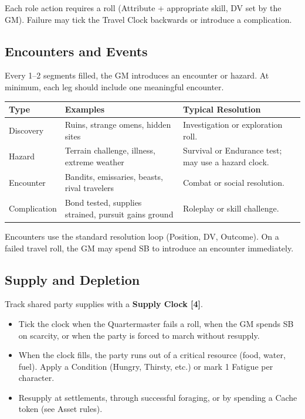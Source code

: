 Each role action requires a roll (Attribute + appropriate skill, DV set by the GM). Failure may tick the Travel Clock backwards or introduce a complication.

\subsection{Encounters and Events}

Every 1–2 segments filled, the GM introduces an encounter or hazard. At minimum, each leg should include one meaningful encounter.

\begin{tabular}{@{}lp{4cm}p{6cm}@{}}
\toprule
\textbf{Type} & \textbf{Examples} & \textbf{Typical Resolution} \\
\midrule
Discovery & Ruins, strange omens, hidden sites & Investigation or exploration roll. \\
Hazard & Terrain challenge, illness, extreme weather & Survival or Endurance test; may use a hazard clock. \\
Encounter & Bandits, emissaries, beasts, rival travelers & Combat or social resolution. \\
Complication & Bond tested, supplies strained, pursuit gains ground & Roleplay or skill challenge. \\
\bottomrule
\end{tabular}

Encounters use the standard resolution loop (Position, DV, Outcome). On a failed travel roll, the GM may spend SB to introduce an encounter immediately.

\subsection{Supply and Depletion}

Track shared party supplies with a \textbf{Supply Clock [4]}.

\begin{itemize}
  \item Tick the clock when the Quartermaster fails a roll, when the GM spends SB on scarcity, or when the party is forced to march without resupply.
  \item When the clock fills, the party runs out of a critical resource (food, water, fuel). Apply a Condition (Hungry, Thirsty, etc.) or mark 1 Fatigue per character.
  \item Resupply at settlements, through successful foraging, or by spending a Cache token (see Asset rules).
\end{itemize}

